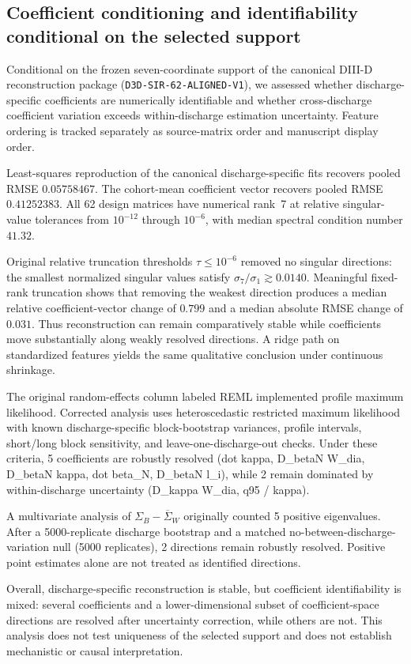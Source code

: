 \subsection{Coefficient conditioning and identifiability conditional on the selected support}
\label{subsec:d3d-coefficient-conditioning}

Conditional on the frozen seven-coordinate support of the canonical DIII-D
reconstruction package (\texttt{D3D-SIR-62-ALIGNED-V1}), we assessed whether
discharge-specific coefficients are numerically identifiable and whether
cross-discharge coefficient variation exceeds within-discharge estimation
uncertainty. Feature ordering is tracked separately as source-matrix order and
manuscript display order.

Least-squares reproduction of the canonical discharge-specific fits recovers
pooled RMSE $0.05758467$. The cohort-mean coefficient
vector recovers pooled RMSE $0.41252383$.
All 62 design matrices have numerical rank~7 at relative singular-value
tolerances from $10^{-12}$ through $10^{-6}$, with median spectral
condition number $41.32$.

Original relative truncation thresholds $\tau\le 10^{-6}$ removed no singular
directions: the smallest normalized singular values satisfy
$\sigma_7/\sigma_1\gtrsim 0.0140$.
Meaningful fixed-rank truncation shows that removing the weakest direction
produces a median relative coefficient-vector change of $0.799$ and a
median absolute RMSE change of $0.031$. Thus reconstruction can remain
comparatively stable while coefficients move substantially along weakly resolved
directions. A ridge path on standardized features yields the same qualitative
conclusion under continuous shrinkage.

The original random-effects column labeled REML implemented profile maximum
likelihood. Corrected analysis uses heteroscedastic restricted maximum
likelihood with known discharge-specific block-bootstrap variances, profile
intervals, short/long block sensitivity, and leave-one-discharge-out checks.
Under these criteria, 5 coefficients are robustly resolved
(dot kappa, D_betaN W_dia, D_betaN kappa, dot beta_N, D_betaN l_i), while 2 remain dominated by within-discharge
uncertainty (D_kappa W_dia, q95 / kappa).

A multivariate analysis of $\Sigma_B-\overline{\Sigma}_W$ originally counted
5 positive eigenvalues.
After a 5000-replicate discharge bootstrap and a
matched no-between-discharge-variation null
(5000 replicates), 2 directions remain robustly
resolved. Positive point estimates alone are not treated as identified
directions.

Overall, discharge-specific reconstruction is stable, but coefficient
identifiability is mixed: several coefficients and a lower-dimensional subset of
coefficient-space directions are resolved after uncertainty correction, while
others are not. This analysis does not test uniqueness of the selected support
and does not establish mechanistic or causal interpretation.
